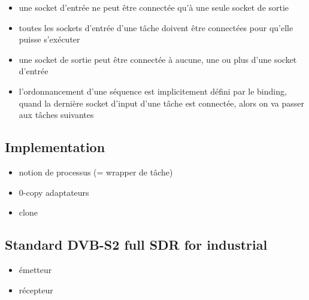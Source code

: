 \begin{itemize}
  \item une socket d'entrée ne peut être connectée qu'à une seule socket de
        sortie
  \item toutes les sockets d'entrée d'une tâche doivent être connectées pour
        qu'elle puisse s'exécuter
  \item une socket de sortie peut être connectée à aucune, une ou plus d'une
        socket d'entrée
  \item l'ordonnancement d'une séquence est implicitement défini par le binding,
        quand la dernière socket d'input d'une tâche est connectée, alors on va
        passer aux tâches suivantes
\end{itemize}

\subsection{Implementation}

\begin{itemize}
  \item notion de processus (= wrapper de tâche)
  \item 0-copy adaptateurs
  \item clone
\end{itemize}

\subsection{Standard DVB-S2 full SDR for industrial}

\begin{itemize}
  \item émetteur
  \item récepteur
\end{itemize}
